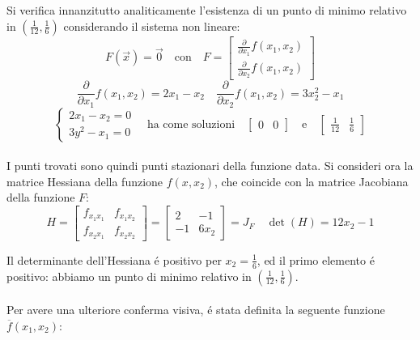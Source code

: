 \begin{center}
\footnotesize\noindent{}\end{center}

\noindent Si verifica innanzitutto analiticamente l'esistenza di un punto di minimo relativo in \((\frac{1}{12}, \frac{1}{6})\) considerando il sistema non lineare:
\[
F(\vec{x}) = \vec{0} \quad \text{con} \quad F = \begin{bmatrix}\frac{\partial}{\partial x_1}f(x_1,x_2) \\ \frac{\partial}{\partial x_2}f(x_1,x_2)  \end{bmatrix}
\]
\[
\frac{\partial}{\partial x_1}f(x_1,x_2) = 2x_1 -x_2 \quad \frac{\partial}{\partial x_2}f(x_1,x_2) = 3x_2^2 - x_1
\]
\[
\begin{cases}
2x_1 -x_2 = 0 \\
3y^2 - x_1 = 0
\end{cases}
\quad \text{ha come soluzioni} \quad \begin{bmatrix}0 & 0 \end{bmatrix} \quad \text{e} \quad \begin{bmatrix}\frac{1}{12} & \frac{1}{6}\end{bmatrix}
\]
\\
\noindent I punti trovati sono quindi punti stazionari della funzione data. Si consideri ora la matrice Hessiana della funzione \(f(x,x_2)\), che coincide con la matrice Jacobiana della funzione \(F\):
\[
H =
\begin{bmatrix} f_{x_1x_1} & f_{x_1x_2} \\ f_{x_2x_1} & f_{x_2x_2} \end{bmatrix}
=
\begin{bmatrix} 2 & -1 \\ -1 & 6x_2 \end{bmatrix}
= J_F
\quad
\det(H) = 12x_2 - 1
\]

\noindent Il determinante dell'Hessiana \'e positivo per \(x_2=\frac{1}{6}\), ed il primo elemento \'e positivo: abbiamo un punto di minimo relativo in \((\frac{1}{12}, \frac{1}{6})\).
\\
\\
\noindent Per avere una ulteriore conferma visiva, \'e stata definita la seguente funzione \(\overline{f}(x_1,x_2)\):

